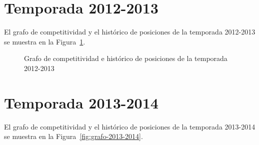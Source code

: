 \clearpage

\section{Temporada 2012-2013}

El grafo de competitividad y el histórico de posiciones de la temporada 2012-2013 se muestra en la Figura~\ref{fig:grafo-2012-2013}.

\begin{figure}[htbp]
\centering
{}
\caption[Competitividad de la temporada 2012-2013]{Grafo de competitividad e histórico de posiciones de la temporada 2012-2013} \label{fig:grafo-2012-2013}
\end{figure}

\clearpage

\section{Temporada 2013-2014}

El grafo de competitividad y el histórico de posiciones de la temporada 2013-2014 se muestra en la Figura~\ref{fig:grafo-2013-2014}.

